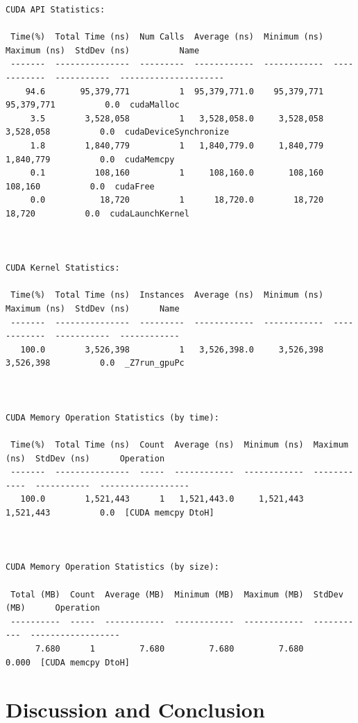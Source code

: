 \documentclass[english]{exam}
\begin{document}
\begin{lstlisting}[style=CStyle]
CUDA API Statistics:

 Time(%)  Total Time (ns)  Num Calls  Average (ns)  Minimum (ns)  Maximum (ns)  StdDev (ns)          Name         
 -------  ---------------  ---------  ------------  ------------  ------------  -----------  ---------------------
    94.6       95,379,771          1  95,379,771.0    95,379,771    95,379,771          0.0  cudaMalloc           
     3.5        3,528,058          1   3,528,058.0     3,528,058     3,528,058          0.0  cudaDeviceSynchronize
     1.8        1,840,779          1   1,840,779.0     1,840,779     1,840,779          0.0  cudaMemcpy           
     0.1          108,160          1     108,160.0       108,160       108,160          0.0  cudaFree             
     0.0           18,720          1      18,720.0        18,720        18,720          0.0  cudaLaunchKernel     



CUDA Kernel Statistics:

 Time(%)  Total Time (ns)  Instances  Average (ns)  Minimum (ns)  Maximum (ns)  StdDev (ns)      Name    
 -------  ---------------  ---------  ------------  ------------  ------------  -----------  ------------
   100.0        3,526,398          1   3,526,398.0     3,526,398     3,526,398          0.0  _Z7run_gpuPc



CUDA Memory Operation Statistics (by time):

 Time(%)  Total Time (ns)  Count  Average (ns)  Minimum (ns)  Maximum (ns)  StdDev (ns)      Operation     
 -------  ---------------  -----  ------------  ------------  ------------  -----------  ------------------
   100.0        1,521,443      1   1,521,443.0     1,521,443     1,521,443          0.0  [CUDA memcpy DtoH]



CUDA Memory Operation Statistics (by size):

 Total (MB)  Count  Average (MB)  Minimum (MB)  Maximum (MB)  StdDev (MB)      Operation     
 ----------  -----  ------------  ------------  ------------  -----------  ------------------
      7.680      1         7.680         7.680         7.680        0.000  [CUDA memcpy DtoH]
\end{lstlisting}

\section*{Discussion and Conclusion}
\end{document}
